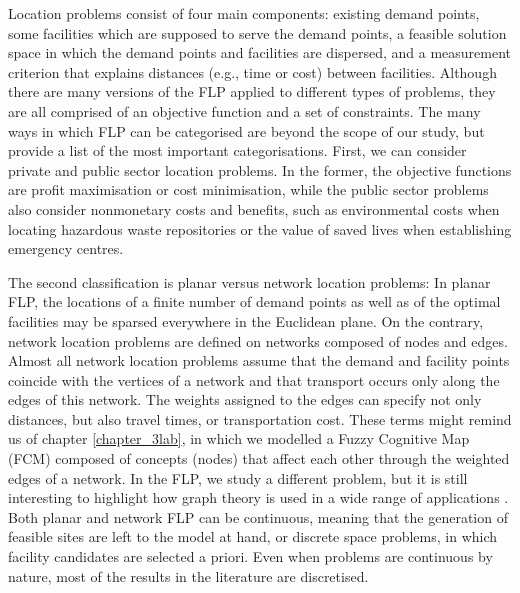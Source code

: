 Location problems consist of four main components: existing demand points, some facilities which are supposed to serve the demand points, a feasible solution space in which the demand points and facilities are dispersed, and a measurement criterion that explains distances (e.g., time or cost) between facilities. Although there are many versions of the FLP applied to different types of problems, they are all comprised of an objective function and a set of constraints. The many ways in which FLP can be categorised are beyond the scope of our study, but \cite{wolf2022solving} provide a list of the most important categorisations. First, we can consider private and public sector location problems. In the former, the objective functions are profit maximisation or cost minimisation, while the public sector problems also consider nonmonetary costs and benefits, such as environmental costs when locating hazardous waste repositories or the value of saved lives when establishing emergency centres. 

The second classification is planar versus network location problems: In planar FLP, the locations of a finite number of demand points as well as of the optimal facilities may be sparsed everywhere in the Euclidean plane. On the contrary, network location problems are defined on networks composed of nodes and edges. Almost all network location problems assume that the demand and facility points coincide with the vertices of a network and that transport occurs only along the edges of this network. The weights assigned to the edges can specify not only distances, but also travel times, or transportation cost. These terms might remind us of chapter \cref{chapter_3lab}, in which we modelled a Fuzzy Cognitive Map (FCM) composed of concepts (nodes) that affect each other through the weighted edges of a network. In the FLP, we study a different problem, but it is still interesting to highlight how graph theory is used in a wide range of applications \citep{papageorgiou2003fuzzy, seppanen1970facilities}. Both planar and network FLP can be continuous, meaning that the generation of feasible sites are left to the model at hand, or discrete space problems, in which facility candidates are selected a priori. Even when problems are continuous by nature, most of the results in the literature are discretised.

